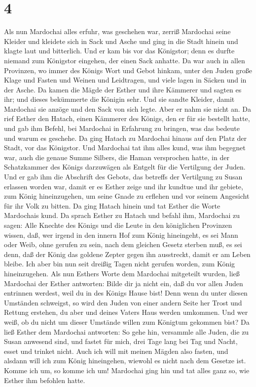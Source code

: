 \hypertarget{section-3}{%
\section{4}\label{section-3}}

 Als nun Mardochai alles erfuhr, was geschehen war, zerriß
Mardochai seine Kleider und kleidete sich in Sack und Asche und ging in
die Stadt hinein und klagte laut und bitterlich.  Und er
kam bis vor das Königstor; denn es durfte niemand zum Königstor
eingehen, der einen Sack anhatte.  Da war auch in allen
Provinzen, wo immer des Königs Wort und Gebot hinkam, unter den Juden
große Klage und Fasten und Weinen und Leidtragen, und viele lagen in
Säcken und in der Asche.  Da kamen die Mägde der Esther
und ihre Kämmerer und sagten es ihr; und dieses bekümmerte die Königin
sehr. Und sie sandte Kleider, damit Mardochai sie anzöge und den Sack
von sich legte. Aber er nahm sie nicht an.  Da rief Esther
den Hatach, einen Kämmerer des Königs, den er für sie bestellt hatte,
und gab ihm Befehl, bei Mardochai in Erfahrung zu bringen, was das
bedeute und warum es geschehe.  Da ging Hatach zu
Mardochai hinaus auf den Platz der Stadt, vor das Königstor.
 Und Mardochai tat ihm alles kund, was ihm begegnet war,
auch die genaue Summe Silbers, die Haman versprochen hatte, in der
Schatzkammer des Königs darzuwägen als Entgelt für die Vertilgung der
Juden.  Und er gab ihm die Abschrift des Gebots, das
betreffs der Vertilgung zu Susan erlassen worden war, damit er es Esther
zeige und ihr kundtue und ihr gebiete, zum König hineinzugehen, um seine
Gnade zu erflehen und vor seinem Angesicht für ihr Volk zu bitten.
 Da ging Hatach hinein und tat Esther die Worte Mardochais
kund.  Da sprach Esther zu Hatach und befahl ihm,
Mardochai zu sagen:  Alle Knechte des Königs und die
Leute in den königlichen Provinzen wissen, daß, wer irgend in den innern
Hof zum König hineingeht, es sei Mann oder Weib, ohne gerufen zu sein,
nach dem gleichen Gesetz sterben muß, es sei denn, daß der König das
goldene Zepter gegen ihn ausstreckt, damit er am Leben bleibe. Ich aber
bin nun seit dreißig Tagen nicht gerufen worden, zum König
hineinzugehen.  Als nun Esthers Worte dem Mardochai
mitgeteilt wurden,  ließ Mardochai der Esther antworten:
Bilde dir ja nicht ein, daß du vor allen Juden entrinnen werdest, weil
du in des Königs Hause bist!  Denn wenn du unter diesen
Umständen schweigst, so wird den Juden von einer andern Seite her Trost
und Rettung erstehen, du aber und deines Vaters Haus werden umkommen.
Und wer weiß, ob du nicht um dieser Umstände willen zum Königtum
gekommen bist?  Da ließ Esther dem Mardochai antworten:
 So gehe hin, versammle alle Juden, die zu Susan anwesend
sind, und fastet für mich, drei Tage lang bei Tag und Nacht, esset und
trinket nicht. Auch ich will mit meinen Mägden also fasten, und alsdann
will ich zum König hineingehen, wiewohl es nicht nach dem Gesetze ist.
Komme ich um, so komme ich um!  Mardochai ging hin und
tat alles ganz so, wie Esther ihm befohlen hatte.

